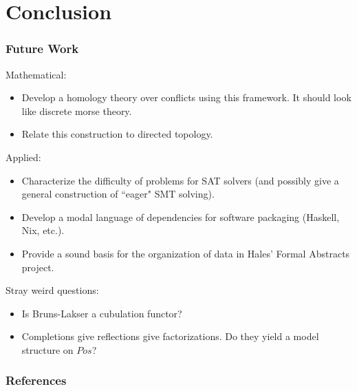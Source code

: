 \documentclass{beamer}
\begin{document}
\section{Conclusion}
\begin{frame}
\frametitle{Future Work}
Mathematical:
\begin{itemize}
\item Develop a homology theory over conflicts using this framework. It should look like discrete morse theory.
\item Relate this construction to directed topology.
\end{itemize}

Applied:
\begin{itemize}
\item Characterize the difficulty of problems for SAT solvers (and possibly give a general construction of ``eager" SMT solving).
\item Develop a modal language of dependencies for software packaging (Haskell, Nix, etc.).
\item Provide a sound basis for the organization of data in Hales' Formal Abstracts project.
\end{itemize}

Stray weird questions:
\begin{itemize}
\item Is Bruns-Lakser a cubulation functor?
\item Completions give reflections give factorizations. Do they yield a model structure on \(Pos\)?
\end{itemize}
\end{frame}

\begin{frame}[allowframebreaks]
        \frametitle{References}
         \nocite{*}
        
	
\end{frame}
\end{document}

